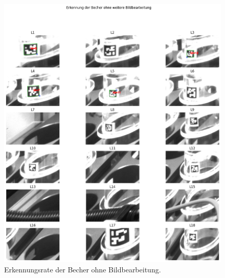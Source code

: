     \begin{figure}
        \caption[Erkennungsrate der Becher ohne weitere Bildverabeitung]{\small Erkennungsrate der Becher ohne Bildbearbeitung.}\label{fig:figure22}
        \includegraphics[width = \textwidth]{Bilder/ErkennungsrateOBB.png}
        \centering
    \end{figure}

